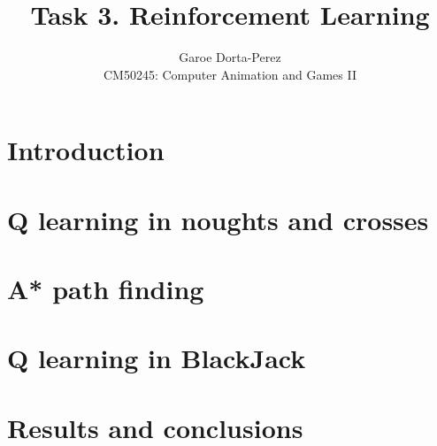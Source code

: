 \documentclass[12pt]{article}
\begin{document}
  
\title{Task 3. Reinforcement Learning}
\author{Garoe Dorta-Perez\\
CM50245: Computer Animation and Games II}
 
\maketitle
 
\section{Introduction}

\section{Q learning in noughts and crosses}

\section{A* path finding}

\section{Q learning in BlackJack}

\section{Results and conclusions}

%
%
\end{document}
